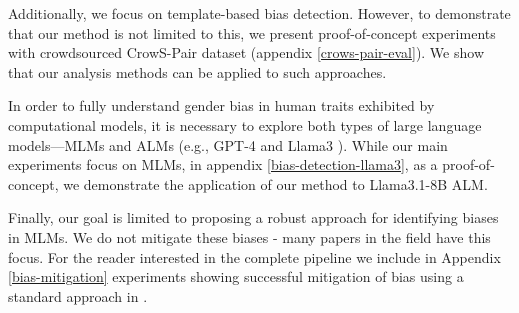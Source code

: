 Additionally, we focus on template-based bias detection.  However, to demonstrate that our method is not limited to this, we present proof-of-concept experiments with crowdsourced CrowS-Pair \cite{nangia-etal-2020-crows} dataset (appendix \ref{crows-pair-eval}). We show that our analysis methods can be applied to such approaches.

In order to fully understand gender bias in human traits exhibited by computational models, it is necessary to explore both types of large language models—MLMs and ALMs (e.g., GPT-4 \cite{achiam2023gpt} and Llama3 \cite{dubey2024llama}). While our main experiments focus on MLMs, in appendix \ref{bias-detection-llama3}, as a proof-of-concept, we demonstrate the application of our method to  Llama3.1-8B ALM. 

Finally, our goal is limited to proposing a robust approach for identifying biases in MLMs. We do not mitigate these biases - many papers in the field have this focus. For the reader interested in the complete pipeline we include in Appendix \ref{bias-mitigation} experiments showing successful mitigation of bias using a standard approach in  \citet{bartl-etal-2020-unmasking}.